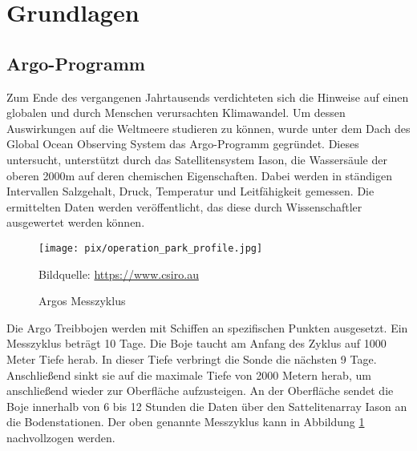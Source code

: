 \section{Grundlagen}




    \subsection{Argo-Programm}


    Zum Ende des vergangenen Jahrtausends verdichteten sich die Hinweise auf einen globalen und durch Menschen verursachten Klimawandel. Um dessen Auswirkungen auf die Weltmeere studieren zu können, wurde unter dem Dach des Global Ocean Observing System das Argo-Programm gegründet. Dieses untersucht, unterstützt durch das Satellitensystem Iason, die Wassersäule der oberen 2000m auf deren chemischen Eigenschaften. Dabei werden in ständigen Intervallen Salzgehalt, Druck, Temperatur und Leitfähigkeit gemessen. Die ermittelten Daten werden veröffentlicht, das diese durch Wissenschaftler ausgewertet werden können.


    \begin{figure}[h]
        \centering
        \texttt{[image: pix/operation\_park\_profile.jpg]}
        \caption[Argos Messzyklus]{Argos  Messzyklus}
        \footnotesize{
            Bildquelle: \href{https://www.csiro.au/en/Research/OandA/Areas/Marine-technologies/Argo-robotic-floats}
                        {\url{https://www.csiro.au}}
        }
        \label{fig:Argo-messzyklus}
    \end{figure}

    Die Argo Treibbojen werden mit Schiffen an spezifischen Punkten ausgesetzt. Ein Messzyklus beträgt 10 Tage. Die Boje taucht am Anfang des Zyklus auf 1000 Meter Tiefe herab.  In dieser Tiefe verbringt die Sonde die nächsten 9 Tage. Anschließend sinkt sie auf die maximale Tiefe von 2000 Metern herab, um anschließend wieder zur Oberfläche aufzusteigen. An der Oberfläche sendet die Boje innerhalb von 6 bis 12 Stunden die Daten über den Sattelitenarray Iason an die Bodenstationen. Der oben genannte Messzyklus kann in Abbildung \ref{fig:Argo-messzyklus} nachvollzogen werden.

